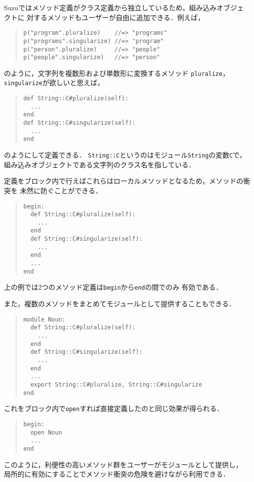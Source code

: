 \documentclass[a4paper,11pt,dvipdfmx]{jreport}
\begin{document}
Suzuではメソッド定義がクラス定義から独立しているため，組み込みオブジェクトに
対するメソッドもユーザーが自由に追加できる．例えば，
\begin{quote}
\begin{verbatim}
p("program".pluralize)    //=> "programs"
p("programs".singularize) //=> "program"
p("person".pluralize)     //=> "people"
p("people".singularize)   //=> "person"
\end{verbatim}
\end{quote}
のように，文字列を複数形および単数形に変換するメソッド
\verb|pluralize|，\verb|singularize|が欲しいと思えば，
\begin{quote}
\begin{verbatim}
def String::C#pluralize(self):
  ...
end
def String::C#singularize(self):
  ...
end
\end{verbatim}
\end{quote}
のようにして定義できる．
\verb|String::C|というのはモジュール\verb|String|の変数\verb|C|で，
組み込みオブジェクトである文字列のクラス名を指している．

定義をブロック内で行えばこれらはローカルメソッドとなるため，メソッドの衝突を
未然に防ぐことができる．
\begin{quote}
\begin{verbatim}
begin:
  def String::C#pluralize(self):
    ...
  end
  def String::C#singularize(self):
    ...
  end
  ...
end
\end{verbatim}
\end{quote}
上の例では2つのメソッド定義は\verb|begin|から\verb|end|の間でのみ
有効である．

また，複数のメソッドをまとめてモジュールとして提供することもできる．
\begin{quote}
\begin{verbatim}
module Noun:
  def String::C#pluralize(self):
    ...
  end
  def String::C#singularize(self):
    ...
  end
  ...
  export String::C#pluralize, String::C#singularize
end
\end{verbatim}
\end{quote}
これをブロック内で\verb|open|すれば直接定義したのと同じ効果が得られる．
\begin{quote}
\begin{verbatim}
begin:
  open Noun
  ...
end
\end{verbatim}
\end{quote}
このように，利便性の高いメソッド群をユーザーがモジュールとして提供し，
局所的に有効にすることでメソッド衝突の危険を避けながら利用できる．
\end{document}
